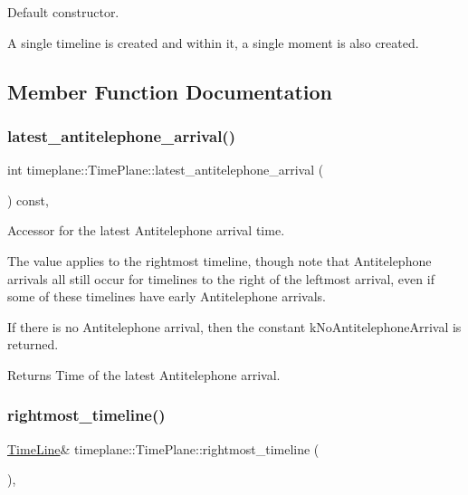 Default constructor. 

A single timeline is created and within it, a single moment is also created. 

\subsection{Member Function Documentation}
\mbox{\label{classtimeplane_1_1_time_plane_ae66d15a7ce9adb5f63906011a455400b}} 
\subsubsection{\texorpdfstring{latest\+\_\+antitelephone\+\_\+arrival()}{latest\_antitelephone\_arrival()}}
{\footnotesize\ttfamily int timeplane\+::\+Time\+Plane\+::latest\+\_\+antitelephone\+\_\+arrival (\begin{DoxyParamCaption}{ }\end{DoxyParamCaption}) const\hspace{0.3cm}{\ttfamily [inline]}, {\ttfamily [noexcept]}}



Accessor for the latest Antitelephone arrival time. 

The value applies to the rightmost timeline, though note that Antitelephone arrivals all still occur for timelines to the right of the leftmost arrival, even if some of these timelines have early Antitelephone arrivals.

If there is no Antitelephone arrival, then the constant {\ttfamily k\+No\+Antitelephone\+Arrival} is returned. \begin{DoxyReturn}{Returns}
Time of the latest Antitelephone arrival. 
\end{DoxyReturn}
\mbox{\label{classtimeplane_1_1_time_plane_a317c9e247011cf5f4e6e36f2f7651932}} 
\subsubsection{\texorpdfstring{rightmost\+\_\+timeline()}{rightmost\_timeline()}}
{\footnotesize\ttfamily \hyperlink{classtimeplane_1_1_time_line}{Time\+Line}\& timeplane\+::\+Time\+Plane\+::rightmost\+\_\+timeline (\begin{DoxyParamCaption}{ }\end{DoxyParamCaption})\hspace{0.3cm}{\ttfamily [inline]}, {\ttfamily [noexcept]}}



